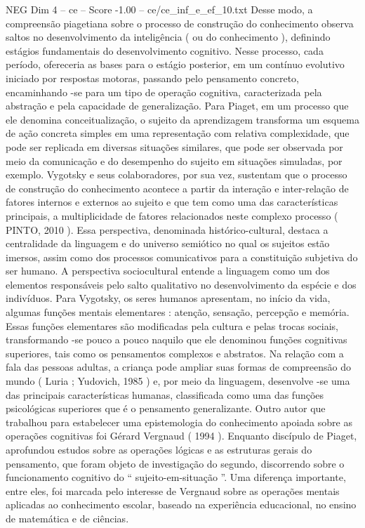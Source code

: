 \begin{textsample}{NEG Dim 4 – ce – Score -1.00 – ce/ce\_inf\_e\_ef\_10.txt}
Desse modo, a compreensão piagetiana sobre o processo de construção do conhecimento observa saltos no desenvolvimento da inteligência ( ou do conhecimento ), definindo estágios fundamentais do desenvolvimento cognitivo.
Nesse processo, cada período, ofereceria as bases para o estágio posterior, em um contínuo evolutivo iniciado por respostas motoras, passando pelo pensamento concreto, encaminhando -se para um tipo de operação cognitiva, caracterizada pela abstração e pela capacidade de generalização.
Para Piaget, em um processo que ele denomina conceitualização, o sujeito da aprendizagem transforma um esquema de ação concreta simples em uma representação com relativa complexidade, que pode ser replicada em diversas situações similares, que pode ser observada por meio da comunicação e do desempenho do sujeito em situações simuladas, por exemplo.
Vygotsky e seus colaboradores, por sua vez, sustentam que o processo de construção do conhecimento acontece a partir da interação e inter-relação de fatores internos e externos ao sujeito e que tem como uma das características principais, a multiplicidade de fatores relacionados neste complexo processo ( PINTO, 2010 ).
Essa perspectiva, denominada histórico-cultural, destaca a centralidade da linguagem e do universo semiótico no qual os sujeitos estão imersos, assim como dos processos comunicativos para a constituição subjetiva do ser humano.
A perspectiva sociocultural entende a linguagem como um dos elementos responsáveis pelo salto qualitativo no desenvolvimento da espécie e dos indivíduos.
Para Vygotsky, os seres humanos apresentam, no início da vida, algumas funções mentais elementares : atenção, sensação, percepção e memória.
Essas funções elementares são modificadas pela cultura e pelas trocas sociais, transformando -se pouco a pouco naquilo que ele denominou funções cognitivas superiores, tais como os pensamentos complexos e abstratos.
Na relação com a fala das pessoas adultas, a criança pode ampliar suas formas de compreensão do mundo ( Luria ; Yudovich, 1985 ) e, por meio da linguagem, desenvolve -se uma das principais características humanas, classificada como uma das funções psicológicas superiores que é o pensamento generalizante.
Outro autor que trabalhou para estabelecer uma epistemologia do conhecimento apoiada sobre as operações cognitivas foi Gérard Vergnaud ( 1994 ).
Enquanto discípulo de Piaget, aprofundou estudos sobre as operações lógicas e as estruturas gerais do pensamento, que foram objeto de investigação do segundo, discorrendo sobre o funcionamento cognitivo do “ sujeito-em-situação ”.
Uma diferença importante, entre eles, foi marcada pelo interesse de Vergnaud sobre as operações mentais aplicadas ao conhecimento escolar, baseado na experiência educacional, no ensino de matemática e de ciências.

\end{textsample}
